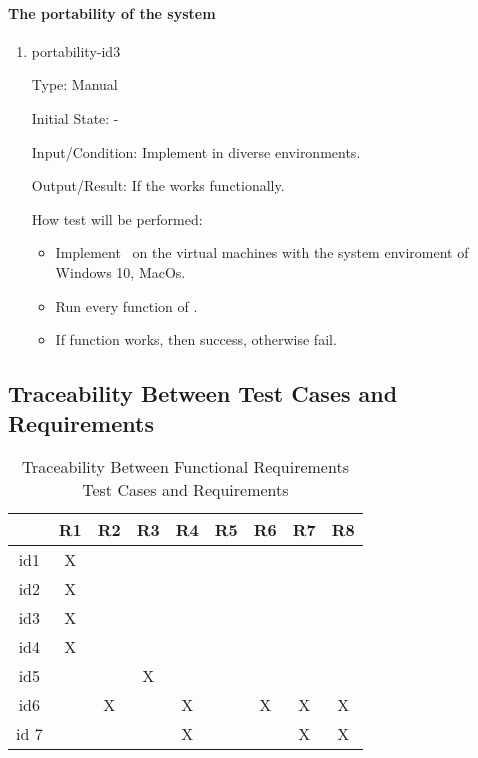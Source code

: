 \documentclass[12pt, titlepage]{article}
\begin{document}
\paragraph{The portability of the system}
\begin{enumerate}

\item{portability-id3\\}

Type: Manual
					
Initial State: -
					
Input/Condition: Implement \progname in diverse environments.
					
Output/Result: If the \progname works functionally.
					
How test will be performed:
 \begin{itemize}
\item Implement \progname ~on the
virtual machines with the system enviroment of Windows 10, MacOs. 
\item Run every function of \progname. 
\item If function works, then success, otherwise fail. 
\end{itemize} 
\end{enumerate}


\newpage
\subsection{Traceability Between Test Cases and Requirements}


\begin{table}[h!]
\centering
\begin{tabular}{|c|c|c|c|c|c|c|c|c|}
\hline        
	& R1& R2 & R3 &R4 & R5 &R6  &R7 &R8 \\
\hline
id1        & X &    &     &    &    &    &   &     \\ \hline
id2        & X &    &     &    &    &    &   &     \\ \hline
id3        & X &    &     &    &    &    &   &     \\ \hline
id4        & X &    &     &    &    &    &   &     \\ \hline
id5        &    &    & X  &    &    &    &   &     \\  \hline
id6      &    & X &     & X &    & X & X & X   \\ \hline
id 7      &    &    &     & X &    &    & X & X  \\ \hline


\hline
\end{tabular}
\caption{Traceability Between Functional Requirements Test Cases and
Requirements}
\label{Table:trace}
\end{table}
\end{document}
